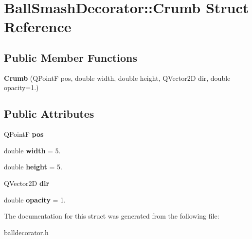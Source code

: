 \hypertarget{struct_ball_smash_decorator_1_1_crumb}{}\section{Ball\+Smash\+Decorator\+:\+:Crumb Struct Reference}
\label{struct_ball_smash_decorator_1_1_crumb}
\subsection*{Public Member Functions}
\begin{DoxyCompactItemize}
\item 
\mbox{\label{struct_ball_smash_decorator_1_1_crumb_a56aecb399208100c5949fd769841c471}} 
{\bfseries Crumb} (Q\+PointF pos, double width, double height, Q\+Vector2D dir, double opacity=1.)
\end{DoxyCompactItemize}
\subsection*{Public Attributes}
\begin{DoxyCompactItemize}
\item 
\mbox{\label{struct_ball_smash_decorator_1_1_crumb_a227020594ba8919c73e6d99b81295015}} 
Q\+PointF {\bfseries pos}
\item 
\mbox{\label{struct_ball_smash_decorator_1_1_crumb_a819ee5d8334f427a3e88d50dd020ff41}} 
double {\bfseries width} = 5.
\item 
\mbox{\label{struct_ball_smash_decorator_1_1_crumb_a127266575a109f1074ef8d007abcf97d}} 
double {\bfseries height} = 5.
\item 
\mbox{\label{struct_ball_smash_decorator_1_1_crumb_aae0338b32f39f2afafdc80796591fe24}} 
Q\+Vector2D {\bfseries dir}
\item 
\mbox{\label{struct_ball_smash_decorator_1_1_crumb_a7d3c5a6ae93d33b50fc6209e2573ac80}} 
double {\bfseries opacity} = 1.
\end{DoxyCompactItemize}


The documentation for this struct was generated from the following file\+:\begin{DoxyCompactItemize}
\item 
balldecorator.\+h\end{DoxyCompactItemize}
